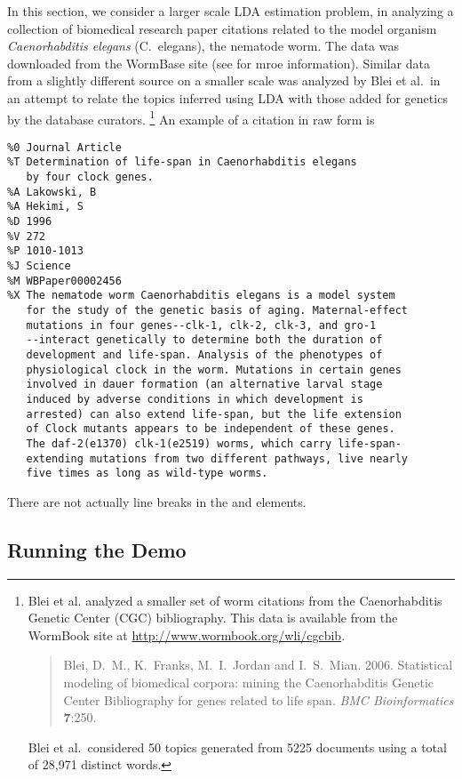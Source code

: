 In this section, we consider a larger scale LDA estimation problem, in
analyzing a collection of biomedical research paper citations related
to the model organism {\it Caenorhabditis elegans} ({C.~elegans}), the
nematode worm.  The data was downloaded from the WormBase site (see
 for mroe information).  Similar data from a
slightly different source on a smaller scale was analyzed by Blei et
al.\ in an attempt to relate the topics inferred using LDA with those
added for genetics by the database curators.%
%
\footnote{Blei et al.  analyzed a smaller set of worm citations from
  the Caenorhabditis Genetic Center (CGC) bibliography.  This data is
  available from the WormBook site at \url{http://www.wormbook.org/wli/cgcbib}.  
%
\begin{quote}
Blei, D.~M., K.~Franks, M.~I.~Jordan and
  I.~S.~Mian. 2006. Statistical modeling of biomedical corpora: mining
  the Caenorhabditis Genetic Center Bibliography for genes related to
  life span. {\it BMC Bioinformatics} {\bf 7}:250.
\end{quote}
%
Blei et al.\ considered 50 topics generated from 5225 documents using
a total of 28,971 distinct words.  }
%
An example of a citation in raw form is
%
\begin{verbatim}
%0 Journal Article
%T Determination of life-span in Caenorhabditis elegans 
   by four clock genes.
%A Lakowski, B
%A Hekimi, S
%D 1996
%V 272
%P 1010-1013
%J Science
%M WBPaper00002456
%X The nematode worm Caenorhabditis elegans is a model system 
   for the study of the genetic basis of aging. Maternal-effect
   mutations in four genes--clk-1, clk-2, clk-3, and gro-1
   --interact genetically to determine both the duration of 
   development and life-span. Analysis of the phenotypes of
   physiological clock in the worm. Mutations in certain genes 
   involved in dauer formation (an alternative larval stage
   induced by adverse conditions in which development is 
   arrested) can also extend life-span, but the life extension 
   of Clock mutants appears to be independent of these genes. 
   The daf-2(e1370) clk-1(e2519) worms, which carry life-span-
   extending mutations from two different pathways, live nearly 
   five times as long as wild-type worms.
\end{verbatim}
%
There are not actually line breaks in the  and  elements.

\subsection{Running the Demo}

